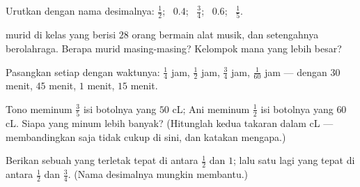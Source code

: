 \begin{exercise}[$\star$]\label{exo:g5:fractions:7}
Urutkan dengan nama desimalnya: $\frac12$; \ $0.4$; \ $\frac34$; \
$0.6$; \ $\frac15$.
\end{exercise}

\begin{exercise}[$\star$]\label{exo:g5:fractions:8}
 murid di kelas yang berisi $28$ orang bermain alat musik,
dan setengahnya berolahraga. Berapa murid masing-masing? Kelompok mana yang lebih besar?
\end{exercise}

\begin{exercise}[$\star$]\label{exo:g5:fractions:9}
Pasangkan setiap  dengan waktunya: $\frac14$ jam, $\frac12$
jam, $\frac34$ jam, $\frac{1}{60}$ jam --- dengan $30$ menit, $45$
menit, $1$ menit, $15$ menit.
\end{exercise}

\begin{exercise}[$\star\star$]\label{exo:g5:fractions:10}
Tono meminum $\frac35$ isi botolnya yang $50$ cL; Ani meminum
$\frac12$ isi botolnya yang $60$ cL. Siapa yang minum lebih banyak?
(Hitunglah kedua takaran dalam cL --- membandingkan  saja
tidak cukup di sini, dan katakan mengapa.)
\end{exercise}

\begin{exercise}[$\star\star$]\label{exo:g5:fractions:11}
Berikan sebuah  yang terletak tepat di antara $\frac12$ dan
$1$; lalu satu lagi yang tepat di antara $\frac12$ dan $\frac34$.
(Nama desimalnya mungkin membantu.)

\end{exercise}
